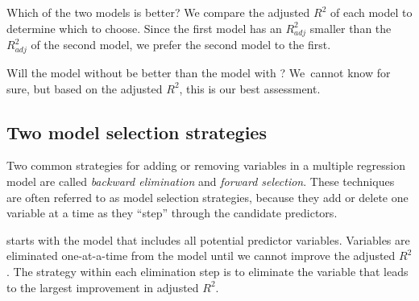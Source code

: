 \begin{example}{Which of the two models is better?}
We compare the adjusted $R^2$ of each model to determine which to choose. Since the first model has an $R^2_{adj}$ smaller than the $R^2_{adj}$ of the second model, we prefer the second model to the first.
\end{example}

Will the model without  be better than the model with ? We~cannot know for sure, but based on the adjusted $R^2$, this is our best assessment.


\subsection{Two model selection strategies}

Two common strategies for adding or removing variables in a multiple regression model are called \emph{backward elimination} and \emph{forward selection}. These techniques are often referred to as  model selection strategies, because they add or delete one variable at a time as they ``step'' through the candidate predictors.

 starts with the model that includes all potential predictor variables. Variables are eliminated one-at-a-time from the model until we cannot improve the adjusted $R^2$. The strategy within each elimination step is to eliminate the variable that leads to the largest improvement in adjusted $R^2$.

